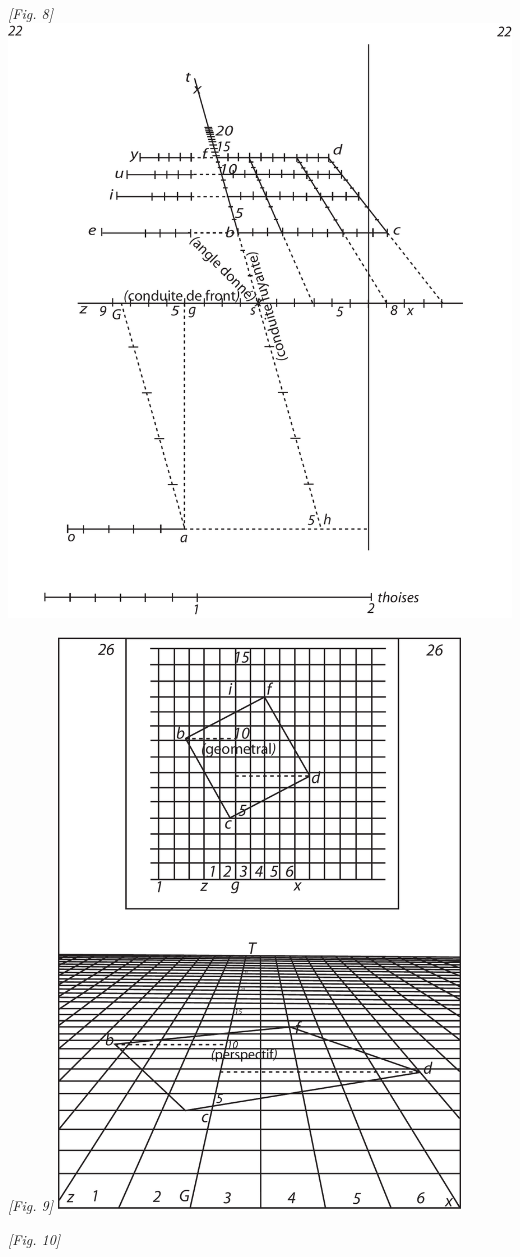 \begin{center}
\\\rule[-4mm]{0mm}{10mm}\textit{[Fig. 8]}
\protect\clearpage
\includegraphics[width=1.0\textwidth]{images/T22-Desargues}
\\\rule[-4mm]{0mm}{10mm}\textit{[Fig. 9]}
\protect\clearpage
\includegraphics[width=0.8\textwidth]{images/T26-Desargues}
\\\rule[-4mm]{0mm}{10mm}\textit{[Fig. 10]}
\end{center}

